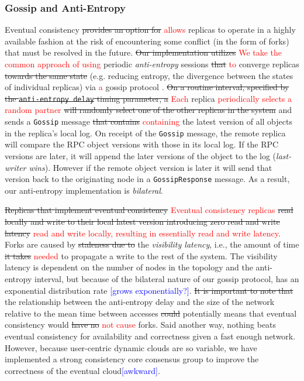 \documentclass{article}
\newcommand{\pjk}[1]{{\bf
    [\marginpar[\hbox{{\textcolor{blue}{pjk}}\raisebox{0ex}{\Huge $\rightarrow$}}]%
{\hbox{\raisebox{0ex}{\Huge $\leftarrow$}{\textcolor{blue}{pjk}}}}\textcolor{blue}{#1}]}}
\renewcommand{\pjk}[1]{\textcolor{blue}{[#1]}}
\newcommand{\pete}[1]{\textcolor{red}{#1}}
\newcommand{\change}[2]{\sout{#1} \textcolor{red}{#2}}
\begin{document}
\subsubsection{Gossip and Anti-Entropy}

Eventual consistency \change{provides an option for}{allows} replicas to operate in a highly available fashion at the risk of encountering some conflict (in the form of forks) that must be resolved in the future. \change{Our implementation utilizes} {We take the common approach of using} periodic \textit{anti-entropy} sessions \change{that}{to} converge replicas \sout{towards the same state} (e.g. reducing entropy, the divergence between the states of individual replicas) via \pete{a} gossip protocol \cite{kempe_gossip-based_2003}. \change{On a routine interval, specified by the \texttt{anti-entropy delay} timing parameter, a}{Each} replica \pete{periodically selects a random partner} \sout{will randomly select one of the other replicas in the system} and sends a \texttt{Gossip} message \change{that contains}{containing} the latest version of all objects in the replica's local log. On receipt of the \texttt{Gossip} message, the remote replica will compare the RPC object versions with those in its local log. If the RPC versions are later, it will append the later versions of the object to the log (\textit{last-writer wins}). However if the remote object version is later it will send that version back to the originating node in a \texttt{GossipResponse} message. As a result, our anti-entropy implementation is \textit{bilateral}.

\change{Replicas that implement eventual consistency}{Eventual consistency replicas} \change{read locally and write to their local latest version introducing zero read and write latency}{read and write locally, resulting in essentially read and write latency}. Forks are caused by \sout{staleness due to} the \textit{visibility latency}, i.e., the amount of time \change{it takes}{needed} to propagate a write to the rest of the system. The visibility latency is dependent on the number of nodes in the topology and the anti-entropy interval, but because of the bilateral nature of our gossip protocol, has an exponential distribution rate \pjk{grows exponentially?}. \sout{It is important to note that} the relationship between the anti-entropy delay and the size of the network relative to the mean time between accesses \sout{could} potentially means that eventual consistency would \change{have no}{not cause} forks. Said another way, nothing beats eventual consistency for availability and correctness given a fast enough network. However, because user-centric dynamic clouds are so variable, we have implemented a strong consistency core consensus group to improve the correctness of the eventual cloud\pjk{awkward}.
\end{document}

